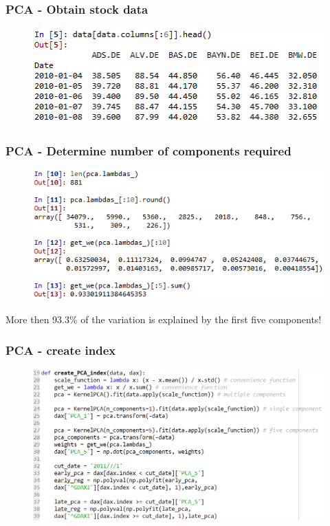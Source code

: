 \documentclass{beamer}
\begin{document}
\begin{frame}
\frametitle{PCA - Obtain stock data}
\begin{figure}[H]
	\includegraphics[scale=0.9]{PCA_retrieve_stock_data.png}
\end{figure}
\end{frame}

\begin{frame}
\frametitle{PCA - Determine number of components required}
\begin{figure}[H]
	\includegraphics[scale=0.9]{PCA_first_five_components.png}
\end{figure}
More then 93.3\% of the variation is explained by the first five components!
\end{frame}

\begin{frame}
\frametitle{PCA - create index}
\begin{figure}[H]
	\includegraphics[scale=0.47]{create_PCA_index.png}
\end{figure}
\end{frame}
\end{document}
